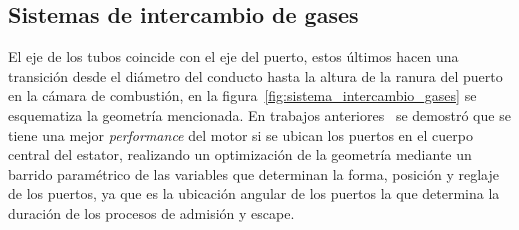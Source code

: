 %
%
%
%
%


\subsection{Sistemas de intercambio de gases}
%

El eje de los tubos coincide con el eje del puerto, estos últimos hacen una
transición desde el diámetro del conducto hasta la altura de la ranura del
puerto en la cámara de combustión, en la
figura~\ref{fig:sistema_intercambio_gases} se esquematiza la geometría
mencionada.
%
En trabajos anteriores~\parencite{lopez13} se demostró que se tiene una mejor
\emph{performance} del motor si se ubican los puertos en el cuerpo central del
estator, realizando un optimización de la geometría mediante un barrido
paramétrico de las variables que determinan la forma, posición y reglaje de los
puertos, ya que es la ubicación angular de los puertos la que determina la
duración de los procesos de admisión y escape.

